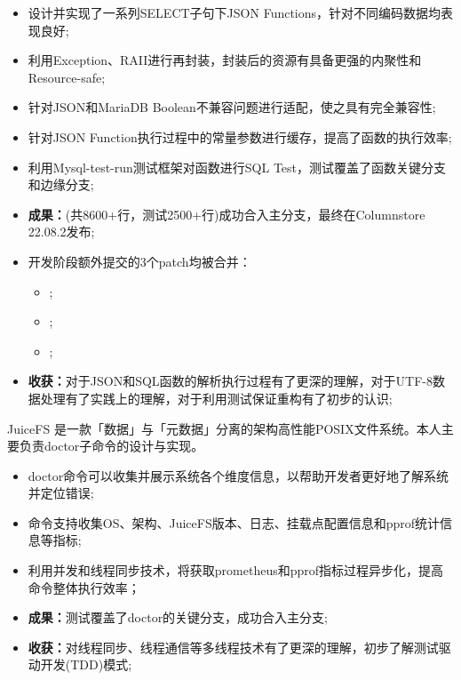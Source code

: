 \documentclass{resume}
\begin{document}
\begin{onehalfspacing}
  \begin{itemize}
    \item 设计并实现了一系列SELECT子句下JSON Functions，针对不同编码数据均表现良好;
    \item 利用Exception、RAII进行再封装，封装后的资源有具备更强的内聚性和Resource-safe;
    \item 针对JSON和MariaDB Boolean不兼容问题进行适配，使之具有完全兼容性;
    \item 针对JSON Function执行过程中的常量参数进行缓存，提高了函数的执行效率;
    \item 利用Mysql-test-run测试框架对函数进行SQL Test，测试覆盖了函数关键分支和边缘分支;
    \item \textbf{成果：}(共8600+行，测试2500+行)成功合入主分支，最终在Columnstore 22.08.2发布;
    \item 开发阶段额外提交的3个patch均被合并：
          \begin{itemize}
            \item {};
            \item {};
            \item {};
          \end{itemize}
    \item \textbf{收获：}对于JSON和SQL函数的解析执行过程有了更深的理解，对于UTF-8数据处理有了实践上的理解，对于利用测试保证重构有了初步的认识;
  \end{itemize}
\end{onehalfspacing}

JuiceFS 是一款「数据」与「元数据」分离的架构高性能POSIX文件系统。本人主要负责doctor子命令的设计与实现。

\begin{onehalfspacing}
  \begin{itemize}
    \item doctor命令可以收集并展示系统各个维度信息，以帮助开发者更好地了解系统并定位错误;
    \item 命令支持收集OS、架构、JuiceFS版本、日志、挂载点配置信息和pprof统计信息等指标;
    \item 利用并发和线程同步技术，将获取prometheus和pprof指标过程异步化，提高命令整体执行效率；
    \item \textbf{成果：}测试覆盖了doctor的关键分支，成功合入主分支;
    \item \textbf{收获：}对线程同步、线程通信等多线程技术有了更深的理解，初步了解测试驱动开发(TDD)模式;
  \end{itemize}
\end{onehalfspacing}
\end{document}
